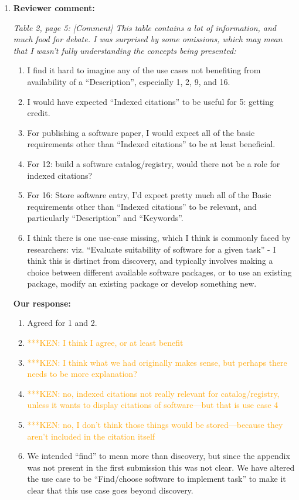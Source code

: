 \documentclass{article}
\newcommand{\niemnote}[1]{ {\textcolor{orange} { ***KEN: #1 }}} %
\begin{document}
\begin{enumerate}
\item \textbf{Reviewer comment:}
{\itshape
Table 2, page 5: [Comment] This table contains a lot of information, and much food for debate. I was surprised by some omissions, which may mean that I wasn't fully understanding the concepts being presented:
\begin{enumerate}[label={(\alph*)}]
\item I find it hard to imagine any of the use cases not benefiting from availability of a ``Description'', especially 1, 2, 9, and 16.
\item I would have expected ``Indexed citations'' to be useful for 5: getting credit.
\item For publishing a software paper, I would expect all of the basic requirements other than ``Indexed citations'' to be at least beneficial.
\item For 12: build a software catalog/registry, would there not be a role for indexed citations?
\item For 16: Store software entry, I'd expect pretty much all of the Basic requirements other than ``Indexed citations'' to be relevant, and particularly ``Description'' and ``Keywords''.
\item I think there is one use-case missing, which I think is commonly faced by researchers: viz. ``Evaluate suitability of software for a given task'' - I think this is distinct from discovery, and typically involves making a choice between different available software packages, or to use an existing package, modify an existing package or develop something new.
\end{enumerate}
}

\textbf{Our response:}

\begin{enumerate}[label={(\alph*)}]
\item Agreed for 1 and 2.
\item \niemnote{I think I agree, or at least benefit}
\item \niemnote{I think what we had originally makes sense, but perhaps there needs to be more explanation?}
\item \niemnote{no, indexed citations not really relevant for catalog/registry, unless it wants to display citations of software---but that is use case 4}
\item \niemnote{no, I don't think those things would be stored---because they aren't included in the citation itself}
\item We intended ``find'' to mean more than discovery, but since the appendix was not present in the first submission this was not clear. We have altered the use case to be ``Find/choose software to implement task'' to make it clear that this use case goes beyond discovery.
\end{enumerate}


\end{enumerate}
\end{document}
